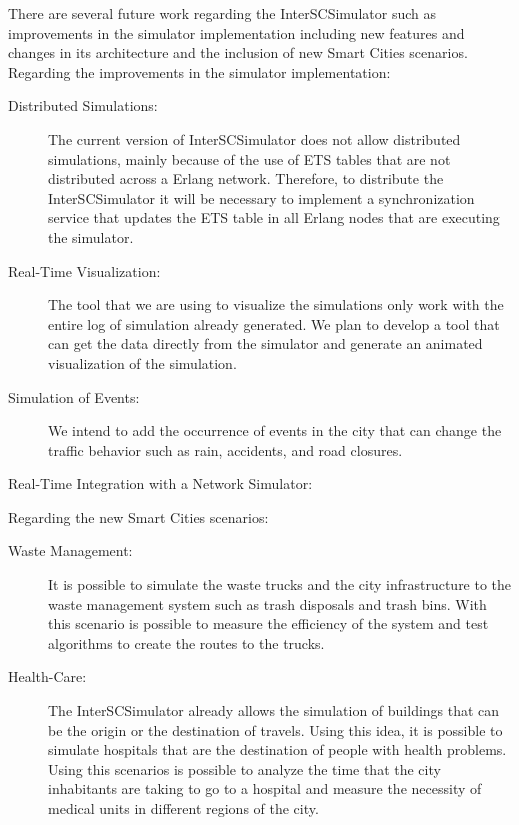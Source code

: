 There are several future work regarding the InterSCSimulator such as improvements in the simulator implementation including new features and changes in its architecture and the inclusion of new Smart Cities scenarios. Regarding the improvements in the simulator implementation:

\begin{description}

\item[Distributed Simulations:] The current version of InterSCSimulator does not allow distributed simulations, mainly because of the use of ETS tables that are not distributed across a Erlang network. Therefore, to distribute the InterSCSimulator it will be necessary to implement a synchronization service that updates the ETS table in all Erlang nodes that are executing the simulator.

\item[Real-Time Visualization:] The tool that we are using to visualize the simulations only work with the entire log of simulation already generated. We plan to develop a tool that can get the data directly from the simulator and generate an animated visualization  of the simulation.

\item[Simulation of Events:] We intend to add the occurrence of events in the city that can change the traffic behavior such as rain, accidents, and road closures.

\item[Real-Time Integration with a Network Simulator:] 

\end{description}

Regarding the new Smart Cities scenarios:

\begin{description}

\item[Waste Management:] It is possible to simulate the waste trucks and the city infrastructure to the waste management system such as trash disposals and trash bins. With this scenario is possible to measure the efficiency of the system and test algorithms to create the routes to the trucks.

\item[Health-Care:] The InterSCSimulator already allows the simulation of buildings that can be the origin or the destination of travels. Using this idea, it is possible to simulate hospitals that are the destination of people with health problems. Using this scenarios is possible to analyze the time that the city inhabitants are taking to go to a hospital and measure the necessity of medical units in different regions of the city.

\end{description}
